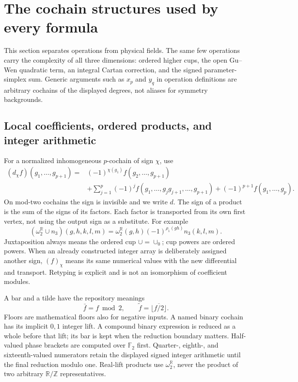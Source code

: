 \section{The cochain structures used by every formula}\label{sec:operations}
This section separates operations from physical fields. The same few operations carry the complexity of all three dimensions: ordered higher cups, the open Gu--Wen quadratic term, an integral Cartan correction, and the signed parameter-simplex sum. Generic arguments such as $x_p$ and $y_q$ in operation definitions are arbitrary cochains of the displayed degrees, not aliases for symmetry backgrounds.

\subsection{Local coefficients, ordered products, and integer arithmetic}
For a normalized inhomogeneous $p$-cochain of sign $\chi$, use
\begin{align}\label{eq:differential}
 (d_\chi f)(g_1,\ldots,g_{p+1})={}&(-1)^{\chi(g_1)}f(g_2,\ldots,g_{p+1})\nonumber\\
 &+\sum_{j=1}^p(-1)^j f(g_1,\ldots,g_jg_{j+1},\ldots,g_{p+1})
 +(-1)^{p+1}f(g_1,\ldots,g_p).
\end{align}
On mod-two cochains the sign is invisible and we write $d$. The sign of a product is the sum of the signs of its factors. Each factor is transported from its own first vertex, not using the output sign as a substitute. For example
\begin{equation}\label{eq:transport-example}
 (\omega_2^{\mathbb R}\cup n_3)(g,h,k,l,m)
 =\omega_2^{\mathbb R}(g,h)(-1)^{\rho_1(gh)}n_3(k,l,m).
\end{equation}
Juxtaposition always means the ordered cup $\cup=\cup_0$; cup powers are ordered powers. When an already constructed integer array is deliberately assigned another sign, $(f)_\chi$ means its same numerical values with the new differential and transport. Retyping is explicit and is not an isomorphism of coefficient modules.

A bar and a tilde have the repository meanings
\begin{equation}\label{eq:digits}
 \bar f=f\bmod2,\qquad \widetilde f=\overline{\lfloor f/2\rfloor}.
\end{equation}
Floors are mathematical floors also for negative inputs. A named binary cochain has its implicit $0,1$ integer lift. A compound binary expression is reduced as a whole before that lift; its bar is kept when the reduction boundary matters. Half-valued phase brackets are computed over $\mathbb F_2$ first. Quarter-, eighth-, and sixteenth-valued numerators retain the displayed signed integer arithmetic until the final reduction modulo one. Real-lift products use $\omega_2^{\mathbb R}$, never the product of two arbitrary $\mathbb R/\mathbb Z$ representatives.

